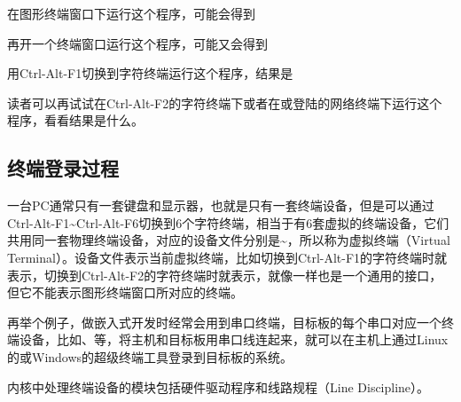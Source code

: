 


在图形终端窗口下运行这个程序，可能会得到




再开一个终端窗口运行这个程序，可能又会得到




用Ctrl-Alt-F1切换到字符终端运行这个程序，结果是




读者可以再试试在Ctrl-Alt-F2的字符终端下或者在或登陆的网络终端下运行这个程序，看看结果是什么。


\subsection{终端登录过程}
%


一台PC通常只有一套键盘和显示器，也就是只有一套终端设备，但是可以通过Ctrl-Alt-F1\textasciitilde{}\BookSplit{}Ctrl-Alt-F6切换到6个字符终端，相当于有6套虚拟的终端设备，它们共用同一套物理终端设备，对应的设备文件分别是\textasciitilde{}，所以称为虚拟终端（Virtual Terminal）。设备文件表示当前虚拟终端，比如切换到Ctrl-Alt-F1的字符终端时就表示，切换到Ctrl-Alt-F2的字符终端时就表示，就像一样也是一个通用的接口，但它不能表示图形终端窗口所对应的终端。



再举个例子，做嵌入式开发时经常会用到串口终端，目标板的每个串口对应一个终端设备，比如、等，将主机和目标板用串口线连起来，就可以在主机上通过Linux的或Windows的超级终端工具登录到目标板的系统。



内核中处理终端设备的模块包括硬件驱动程序和线路规程（Line Discipline）。




